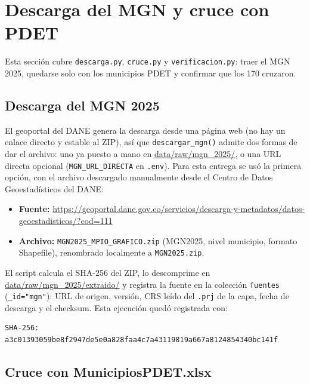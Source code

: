 \documentclass[11pt,a4paper]{article}
\newcommand{\campo}[1]{\texttt{#1}}
\newcommand{\ruta}[1]{\begingroup\urlstyle{tt}\url{#1}\endgroup}
\begin{document}
\section{Descarga del MGN y cruce con PDET}
\label{sec:descarga}

Esta sección cubre \campo{descarga.py}, \campo{cruce.py} y
\campo{verificacion.py}: traer el MGN 2025, quedarse solo con los
municipios PDET y confirmar que los 170 cruzaron.

\subsection{Descarga del MGN 2025}
\label{sec:descarga-mgn}

El geoportal del DANE genera la descarga desde una página web (no hay un
enlace directo y estable al ZIP), así que \campo{descargar\_mgn()} admite
dos formas de dar el archivo: uno ya puesto a mano en
\ruta{data/raw/mgn_2025/}, o una URL directa opcional
(\campo{MGN\_URL\_DIRECTA} en \campo{.env}). Para esta entrega se usó la
primera opción, con el archivo descargado manualmente desde el Centro de
Datos Geoestadísticos del DANE:

\begin{itemize}
  \item \textbf{Fuente:} \url{https://geoportal.dane.gov.co/servicios/descarga-y-metadatos/datos-geoestadisticos/?cod=111}
  \item \textbf{Archivo:} \campo{MGN2025\_MPIO\_GRAFICO.zip} (MGN2025, nivel
        municipio, formato Shapefile), renombrado localmente a
        \campo{MGN2025.zip}.
\end{itemize}

El script calcula el SHA-256 del ZIP, lo descomprime en
\ruta{data/raw/mgn_2025/extraido/} y registra la fuente en la colección
\campo{fuentes} (\campo{\_id="mgn"}): URL de origen, versión, CRS leído del
\campo{.prj} de la capa, fecha de descarga y el checksum. Esta ejecución
quedó registrada con:

\begin{lstlisting}[caption={Checksum verificado del ZIP descargado.}]
SHA-256: a3c01393059be8f2947de5e0a828faa4c7a43119819a667a8124854340bc141f
\end{lstlisting}

\subsection{Cruce con MunicipiosPDET.xlsx}
\label{sec:descarga-cruce}
\end{document}
